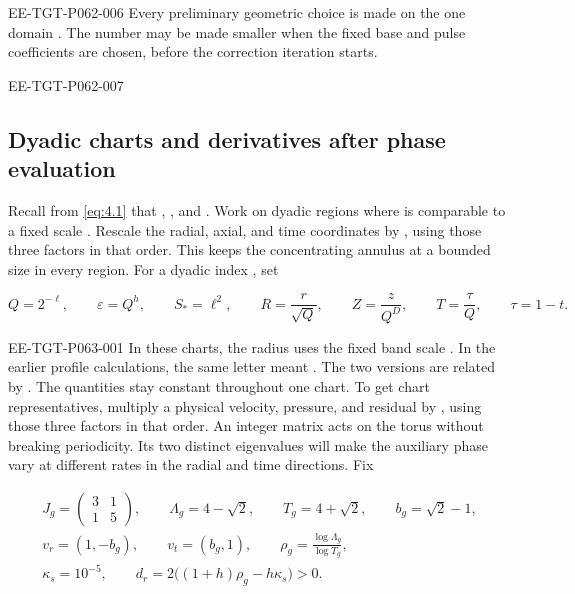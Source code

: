 \begin{EESegment}{EE-TGT-P062-006}
Every preliminary geometric choice is made on the one domain . The number  may be made smaller when the fixed base and pulse coefficients are chosen, before the correction iteration starts.
\end{EESegment}

\begin{EESegment}{EE-TGT-P062-007}
\subsection{Dyadic charts and derivatives after phase evaluation}\label{sec:6.1}

Recall from \eqref{eq:4.1} that , , and . Work on dyadic regions where  is comparable to a fixed scale . Rescale the radial, axial, and time coordinates by , using those three factors in that order. This keeps the concentrating annulus at a bounded size in every region. For a dyadic index , set
\end{EESegment}
\begin{equation}
 Q=2^{-\ell},\qquad \varepsilon=Q^h,\qquad S_*=\ell^2,
 \qquad R=\frac r{\sqrt Q},\qquad Z=\frac z{Q^D},\qquad
 T=\frac\tau Q,\qquad \tau=1-t.
 \tag{6.1}\label{eq:6.1}
\end{equation}
%
\begin{EESegment}{EE-TGT-P063-001}
In these charts, the radius  uses the fixed band scale . In the earlier profile calculations, the same letter meant . The two versions are related by . The quantities  stay constant throughout one chart. To get chart representatives, multiply a physical velocity, pressure, and residual by , using those three factors in that order. An integer matrix acts on the torus without breaking periodicity. Its two distinct eigenvalues will make the auxiliary phase vary at different rates in the radial and time directions. Fix
\end{EESegment}
\begin{equation}
\begin{gathered}
 J_g=\begin{pmatrix}3&1\\1&5\end{pmatrix},\qquad
 \Lambda_g=4-\sqrt2,\qquad T_g=4+\sqrt2,\qquad b_g=\sqrt2-1,\\
 v_r=(1,-b_g),\qquad v_t=(b_g,1),\qquad
 \rho_g=\frac{\log\Lambda_g}{\log T_g},\\
 \kappa_s=10^{-5},\qquad d_r=2\bigl((1+h)\rho_g-h\kappa_s\bigr)>0.
\end{gathered}
\tag{6.2}\label{eq:6.2}
\end{equation}
